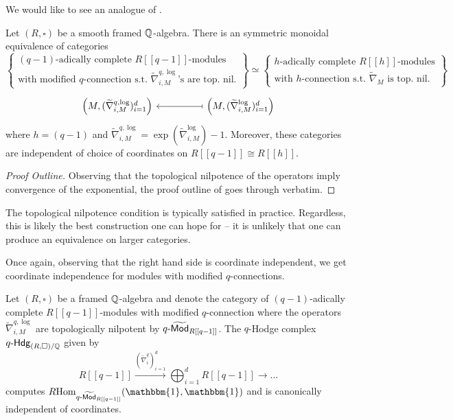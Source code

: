 We would like to see an analogue of . 
\begin{proposition}\label{prop: R-modules with modified connection}
    Let $(R,\square)$ be a smooth framed $\mathbb{Q}$-algebra. There is an symmetric monoidal equivalence of categories 
    $$\left\{\substack{(q-1)\text{-adically complete }R[[q-1]]\text{-modules} \\ \text{with modified }q\text{-connection s.t. }\widetilde{\nabla}^{q,\log}_{i,M}\text{'s are top. nil.}}\right\}\simeq\left\{\substack{h\text{-adically complete }R[[h]]\text{-modules} \\ \text{with }h\text{-connection s.t. }\widetilde{\nabla}_{M}\text{ is top. nil.}}\right\}$$
    $$%
    \begin{tikzcd}
        {\left(M,(\widetilde{\nabla}^{q,\log}_{i,M})_{i=1}^{d}\right)} && {\left(M,(\widetilde{\nabla}_{i,M}^{\log})_{i=1}^{d}\right)}
        \arrow[maps to, from=1-3, to=1-1]
    \end{tikzcd}$$
    where $h=(q-1)$ and $\widetilde{\nabla}^{q,\log}_{i,M}=\exp(\widetilde{\nabla}^{\log}_{i,M})-1$. Moreover, these categories are independent of choice of coordinates on $R[[q-1]]\cong R[[h]]$. 
\end{proposition}
\begin{proof}[Proof Outline]
    Observing that the topological nilpotence of the operators imply convergence of the exponential, the proof outline of  goes through verbatim. 
\end{proof}
\begin{remark}
    The topological nilpotence condition is typically satisfied in practice. Regardless, this is likely the best construction one can hope for -- it is unlikely that one can produce an equivalence on larger categories.  
\end{remark}
Once again, observing that the right hand side is coordinate independent, we get coordinate independence for modules with modified $q$-connections. 
\begin{corollary}\label{corr: modules with modified q-connection are coordinate independent}
    Let $(R,\square)$ be a framed $\mathbb{Q}$-algebra and denote the category of $(q-1)$-adically complete $R[[q-1]]$-modules with modified $q$-connection where the operators $\widetilde{\nabla}_{i,M}^{q,\log}$ are topologically nilpotent by $q\text{-}\widetilde{\mathsf{Mod}}_{R[[q-1]]}$. The $q$-Hodge complex $q\text{-}\mathsf{Hdg}_{(R,\square)/\mathbb{Q}}$ given by 
    $$R[[q-1]]\xrightarrow{(\widetilde{\nabla}_{i}^{q})_{i=1}^{d}}\bigoplus_{i=1}^{d}R[[q-1]]\longrightarrow\dots$$
    computes $R\Hom_{q\dash\widetilde{\Mod}_{R[[q-1]]}}(\mathbbm{1},\mathbbm{1})$ and is canonically independent of coordinates. 
\end{corollary}

